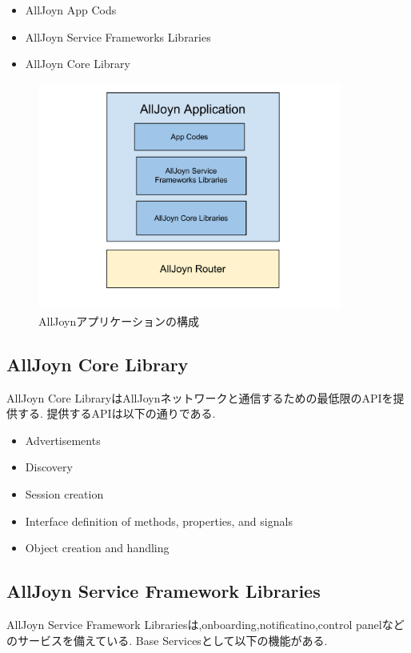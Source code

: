\begin{itemize}
\item AllJoyn App Cods
\item AllJoyn Service Frameworks Libraries
\item AllJoyn Core Library
\end{itemize}

\begin{figure}[htbp]
\centering
\includegraphics[width=10cm]{fig/AllJoyn.pdf}
\caption{AllJoynアプリケーションの構成}
\end{figure}

\subsection{AllJoyn Core Library}
AllJoyn Core LibraryはAllJoynネットワークと通信するための最低限のAPIを提供する.
提供するAPIは以下の通りである.

\begin{itemize}
\item Advertisements
\item Discovery
\item Session creation
\item Interface definition of methods, properties, and signals
\item Object creation and handling
\end{itemize}

\subsection{AllJoyn Service Framework Libraries}
AllJoyn Service Framework Librariesは,onboarding,notificatino,control panelなどのサービスを備えている.
Base Servicesとして以下の機能がある.

